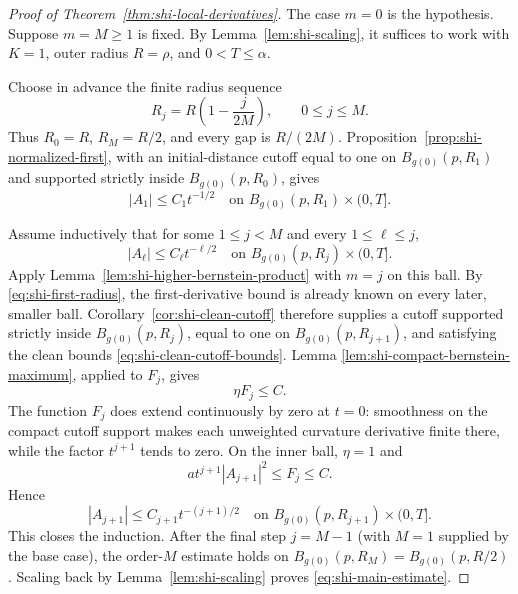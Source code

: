 \documentclass[10pt]{coll-l}
\theoremstyle{definition}
\theoremstyle{remark}
\numberwithin{section}{chapter}
\numberwithin{equation}{chapter}
\begin{document}
\begin{proof}[Proof of Theorem~\ref{thm:shi-local-derivatives}]
The case $m=0$ is the hypothesis.  Suppose $m=M\geq1$ is fixed.  By
Lemma~\ref{lem:shi-scaling}, it suffices to work with $K=1$, outer radius
$R=\rho$, and $0<T\leq\alpha$.

Choose in advance the finite radius sequence
\begin{equation}
       R_j=R\left(1-\frac{j}{2M}\right),
       \qquad 0\leq j\leq M.                             \label{eq:shi-predetermined-radii}
\end{equation}
Thus $R_0=R$, $R_M=R/2$, and every gap is $R/(2M)$.
Proposition~\ref{prop:shi-normalized-first}, with an initial-distance cutoff
equal to one on $B_{g(0)}(p,R_1)$ and supported strictly inside
$B_{g(0)}(p,R_0)$, gives
\begin{equation}
             |A_1|\leq C_1t^{-1/2}
       \quad\text{on }B_{g(0)}(p,R_1)\times(0,T].        \label{eq:shi-first-radius}
\end{equation}

Assume inductively that for some $1\leq j<M$ and every $1\leq\ell\leq j$,
\begin{equation}
       |A_\ell|\leq C_\ell t^{-\ell/2}
       \quad\text{on }B_{g(0)}(p,R_j)\times(0,T].        \label{eq:shi-radius-induction}
\end{equation}
Apply Lemma~\ref{lem:shi-higher-bernstein-product} with $m=j$ on this ball.
By \eqref{eq:shi-first-radius}, the first-derivative bound is already known
on every later, smaller ball.  Corollary~\ref{cor:shi-clean-cutoff} therefore
supplies a cutoff supported strictly inside $B_{g(0)}(p,R_j)$, equal to one
on $B_{g(0)}(p,R_{j+1})$, and satisfying the clean bounds
\eqref{eq:shi-clean-cutoff-bounds}.  Lemma
\ref{lem:shi-compact-bernstein-maximum}, applied to $F_j$, gives
\[
                  \eta F_j\leq C.
\]
The function $F_j$ does extend continuously by zero at $t=0$: smoothness on
the compact cutoff support makes each unweighted curvature derivative
finite there, while the factor $t^{j+1}$ tends to zero.  On the inner ball,
$\eta=1$ and
\[
       a t^{j+1}|A_{j+1}|^2\leq F_j\leq C.
\]
Hence
\[
       |A_{j+1}|\leq C_{j+1}t^{-(j+1)/2}
       \quad\text{on }B_{g(0)}(p,R_{j+1})\times(0,T].
\]
This closes the induction.  After the final step $j=M-1$ (with $M=1$
supplied by the base case), the order-$M$ estimate holds on
$B_{g(0)}(p,R_M)=B_{g(0)}(p,R/2)$.  Scaling back by
Lemma~\ref{lem:shi-scaling} proves \eqref{eq:shi-main-estimate}.
\end{proof}
\end{document}
